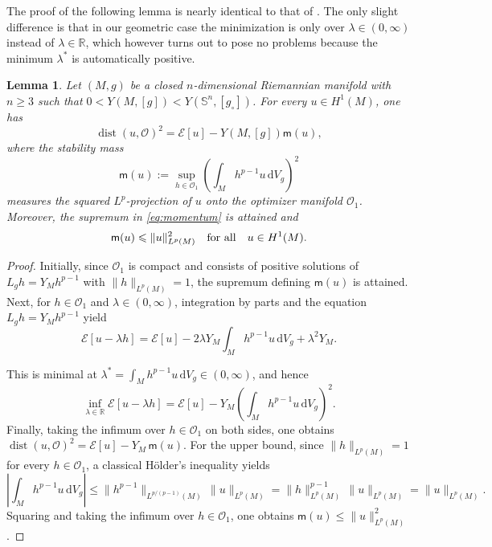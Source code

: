 \documentclass[reqno,11pt]{amsart}
\numberwithin{equation}{section}
\newtheorem{lemma}[theorem]{Lemma}
\theoremstyle{definition}
\theoremstyle{remark}
\newcommand{\ud}{\,\mathrm{d}}
\DeclareMathOperator{\dist}{dist}
\newcommand{\R}{\mathbb{R}}
\newcommand{\Ss}{\mathbb{S}}
\begin{document}
The proof of the following lemma is nearly identical to that of \cite[Lemma~3.3]{DEFFL}. The 
only slight difference is that in our geometric case the minimization is only over $\lambda 
\in (0,\infty)$ instead of $\lambda \in \R$, which however turns out to pose no problems because 
the minimum $\lambda^*$ is automatically positive.

\begin{lemma}
\label{lemma DEFFL distance}
Let $(M,g)$ be a closed $n$-dimensional Riemannian manifold with $n \geqslant 3$ such that $0 < Y(M,[g]) < Y(\Ss^n,[g_\circ])$.
For every $u \in H^1(M)$, one has
\[
\dist(u, \mathscr{O})^2 = \mathcal E[u] - Y(M,[g]) \mathsf{m}(u),
\]
where the \emph{stability mass}
\begin{equation}\label{eq:momentum}
    \mathsf{m}(u) := \sup_{h \in \mathscr{O}_1} \left( \int_M h^{p-1} u \ud V_g \right)^2
\end{equation}
measures the squared $L^p$-projection of $u$ onto the optimizer manifold $\mathscr{O}_1$.
Moreover, the supremum in \eqref{eq:momentum} is attained and 
\[
\mathsf{m}(u) \leqslant \|u\|_{L^p(M)}^2 \quad {\rm for \ all} \quad u \in H^1(M).
\]
\end{lemma}

\begin{proof}
Initially, since $\mathscr{O}_1$ is compact and consists of positive solutions of $L_g h 
= Y_M h^{p-1}$ with $\|h\|_{L^p(M)} = 1$, the supremum defining $\mathsf{m}(u)$ is attained. Next, 
for $h \in \mathscr{O}_1$ and $\lambda \in (0,\infty)$, 
integration by parts and the equation $L_g h = Y_M h^{p-1}$ yield
\[
\mathcal{E}[u - \lambda h] = \mathcal{E}[u] - 2\lambda Y_M \int_M h^{p-1} u \ud V_g + \lambda^2 Y_M.
\]

This is minimal at $\lambda^* = \int_M h^{p-1} u \ud V_g \in (0, \infty)$, and hence
\[
\inf_{\lambda \in \R} \mathcal{E}[u - \lambda h] = \mathcal{E}[u] - Y_M \left(\int_M h^{p-1} u \ud V_g\right)^2.
\]
Finally, taking the infimum over $h \in \mathscr{O}_1$ on both sides, one obtains $\dist(u, \mathscr{O})^2 = \mathcal{E}[u] - Y_M\, \mathsf{m}(u)$. For the upper bound, since $\|h\|_{L^p(M)} = 1$ for every $h \in \mathscr{O}_1$, a classical H\"older's inequality yields
\[
\left|\int_M h^{p-1} u \ud V_g\right| \leqslant \|h^{p-1}\|_{L^{p/(p-1)}(M)}\, \|u\|_{L^p(M)} = \|h\|_{L^p(M)}^{p-1}\, \|u\|_{L^p(M)} = \|u\|_{L^p(M)}.
\]
Squaring and taking the infimum over $h \in \mathscr{O}_1$, one obtains $\mathsf{m}(u) \leqslant \|u\|_{L^p(M)}^2$.
\end{proof}
\end{document}
